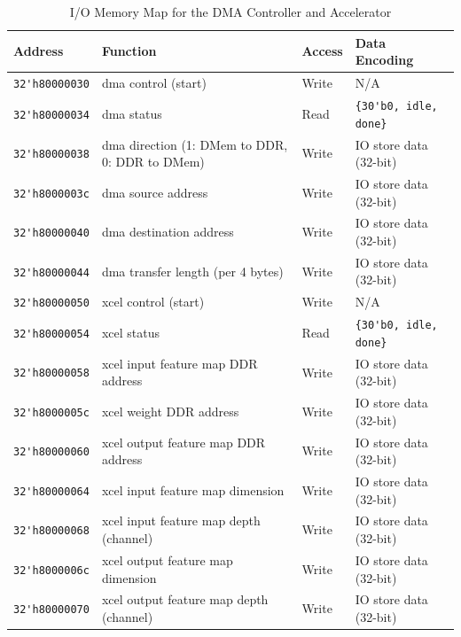 \documentclass[11pt]{article}
\begin{document}
\begin{table}[hbt]
  \begin{center}
    \caption{I/O Memory Map for the DMA Controller and Accelerator}
    \label{mem_map_dma_xcel}
    \begin{adjustbox}{width=\columnwidth,center}
    \begin{tabular}{l l l l}
      \toprule
      \textbf{Address} & \textbf{Function} & \textbf{Access} & \textbf{Data Encoding}\\
      \midrule
      \verb|32'h80000030| & dma control (start) & Write & N/A \\
      \verb|32'h80000034| & dma status & Read & \verb|{30'b0, idle, done}| \\
      \verb|32'h80000038| & dma direction (1: DMem to DDR, 0: DDR to DMem) & Write & IO store data (32-bit) \\
      \verb|32'h8000003c| & dma source address & Write & IO store data (32-bit) \\
      \verb|32'h80000040| & dma destination address & Write & IO store data (32-bit) \\
      \verb|32'h80000044| & dma transfer length (per 4 bytes) & Write & IO store data (32-bit) \\
      \verb|32'h80000050| & xcel control (start) & Write & N/A \\
      \verb|32'h80000054| & xcel status & Read & \verb|{30'b0, idle, done}| \\
      \verb|32'h80000058| & xcel input feature map DDR address & Write & IO store data (32-bit) \\
      \verb|32'h8000005c| & xcel weight DDR address & Write & IO store data (32-bit) \\
      \verb|32'h80000060| & xcel output feature map DDR address & Write & IO store data (32-bit) \\
      \verb|32'h80000064| & xcel input feature map dimension & Write & IO store data (32-bit) \\
      \verb|32'h80000068| & xcel input feature map depth (channel) & Write & IO store data (32-bit) \\
      \verb|32'h8000006c| & xcel output feature map dimension & Write & IO store data (32-bit) \\
      \verb|32'h80000070| & xcel output feature map depth (channel) & Write & IO store data (32-bit) \\
      \bottomrule
    \end{tabular}
    \end{adjustbox}
  \end{center}
\end{table}
\end{document}
